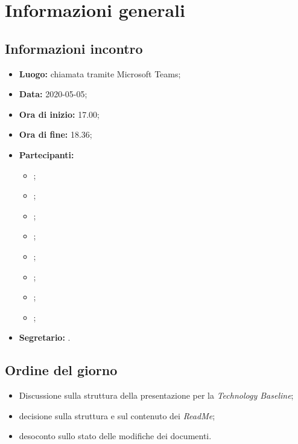 \section{Informazioni generali}
\subsection{Informazioni incontro}
\begin{itemize}
	\item \textbf{Luogo:} chiamata tramite Microsoft Teams; 
	\item \textbf{Data:} 2020-05-05;
	\item \textbf{Ora di inizio:} 17.00; 
	\item \textbf{Ora di fine:} 18.36; 
	\item \textbf{Partecipanti:}
		\begin{itemize}
			\item \VB; 
			\item \LB; 
			\item \NF; 
			\item \EG; 
			\item \FJ; 
			\item \MP; 
			\item \AS; 
			\item \AZ; 
		\end{itemize}
	\item \textbf{Segretario:} \NF. 
\end{itemize}

\subsection{Ordine del giorno}
\begin{itemize}
	\item{Discussione sulla struttura della presentazione per la \textit{Technology Baseline}};
	\item{decisione sulla struttura e sul contenuto dei \textit{ReadMe};}
	\item{desoconto sullo stato delle modifiche dei documenti.}
\end{itemize}
